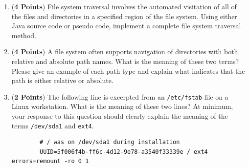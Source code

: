 \documentclass[12pt,epsf,psfig,graphics]{article}
\begin{document}
\begin{enumerate}
\begin{enumerate}
    \item ({\bf 4 Points}) File system traversal involves the automated visitation of all of the files and directories
      in a specified region of the file system. Using either Java source code or pseudo code, implement a complete file
      system traversal method.

    \item ({\bf 4 Points}) A file system often supports navigation of directories with both relative and absolute path
      names.  What is the meaning of these two terms?  Please give an example of each path type and explain what
      indicates that the path is either relative or absolute.

    \item ({\bf 2 Points})  The following line is excerpted from an {\tt /etc/fstab} file on a Linux workstation.  What
      is the meaning of these two lines? At minimum, your response to this question should clearly explain the meaning
      of the terms {\tt /dev/sda1} and {\tt ext4}. \\

      \hspace*{-.75in}
      \vspace*{1in}
      \begin{minipage}{4in}
        \begin{verbatim}
        # / was on /dev/sda1 during installation
        UUID=5f006f4b-ff6c-4d12-9e78-a3540f33339e / ext4 errors=remount -ro 0 1
        \end{verbatim}
      \end{minipage}

  \end{enumerate}

  \newpage



\end{enumerate}
\end{document}
